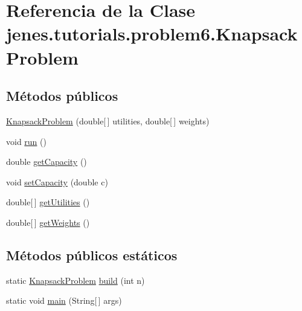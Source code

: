 \hypertarget{classjenes_1_1tutorials_1_1problem6_1_1_knapsack_problem}{\section{Referencia de la Clase jenes.\-tutorials.\-problem6.\-Knapsack\-Problem}
\label{classjenes_1_1tutorials_1_1problem6_1_1_knapsack_problem}
}
\subsection*{Métodos públicos}
\begin{DoxyCompactItemize}
\item 
\hyperlink{classjenes_1_1tutorials_1_1problem6_1_1_knapsack_problem_a5c921b1c3d9dbbe35decc777cf59169d}{Knapsack\-Problem} (double\mbox{[}$\,$\mbox{]} utilities, double\mbox{[}$\,$\mbox{]} weights)
\item 
void \hyperlink{classjenes_1_1tutorials_1_1problem6_1_1_knapsack_problem_a174433680cf824c4238f690d84a43e38}{run} ()
\item 
double \hyperlink{classjenes_1_1tutorials_1_1problem6_1_1_knapsack_problem_af5b99c0408de24f2d7598f14dc597ef7}{get\-Capacity} ()
\item 
void \hyperlink{classjenes_1_1tutorials_1_1problem6_1_1_knapsack_problem_a9caf9c53d4ce0e4b17ceb163ee8ab837}{set\-Capacity} (double c)
\item 
double\mbox{[}$\,$\mbox{]} \hyperlink{classjenes_1_1tutorials_1_1problem6_1_1_knapsack_problem_a1eddd1274f86fe1b3e61668f072dc364}{get\-Utilities} ()
\item 
double\mbox{[}$\,$\mbox{]} \hyperlink{classjenes_1_1tutorials_1_1problem6_1_1_knapsack_problem_a3f94e77e8f2ea920b9ec1dede3ed53f8}{get\-Weights} ()
\end{DoxyCompactItemize}
\subsection*{Métodos públicos estáticos}
\begin{DoxyCompactItemize}
\item 
static \hyperlink{classjenes_1_1tutorials_1_1problem6_1_1_knapsack_problem}{Knapsack\-Problem} \hyperlink{classjenes_1_1tutorials_1_1problem6_1_1_knapsack_problem_aa51d99e0afc8f76e96448bf45d9f412f}{build} (int n)
\item 
static void \hyperlink{classjenes_1_1tutorials_1_1problem6_1_1_knapsack_problem_ae706a456c3248ec8360f10138d364c3e}{main} (String\mbox{[}$\,$\mbox{]} args)
\end{DoxyCompactItemize}



